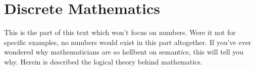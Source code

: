 
\part{Discrete Mathematics} %
\thispagestyle{empty}
This is the part of this text which won't focus on numbers.
Were it not for specific examples, no numbers would exist in this part altogether.
If you've ever wondered why mathematicians are so hellbent on semantics, this will tell you why.
Herein is described the logical theory behind mathematics.
\setcounter{section}{0}





%
%

